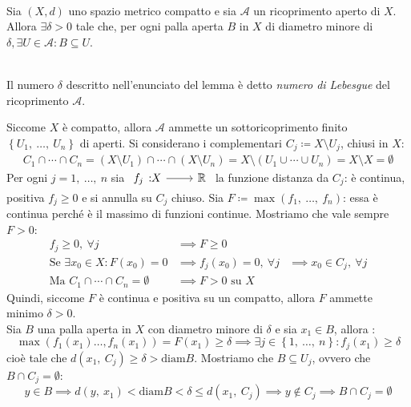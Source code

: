 \begin{lemming}~{}\\\label{teo numero lebesgue}
	Sia $\left(X, d\right)$ uno spazio metrico compatto e sia $\mathcal{A}$ un ricoprimento aperto di $X$. Allora $\exists \delta >0$ tale che, per ogni palla aperta $B$ in $X$ di diametro minore di $\delta, \exists U\in\mathcal{A} \colon B\subseteq U$.	
\end{lemming}
\begin{define}~{}\\
	Il numero $\delta$ descritto nell'enunciato del lemma è detto \textit{numero di Lebesgue}  del ricoprimento $\mathcal{A}$.
\end{define}
\begin{demonstration}
	Siccome $X$ è compatto, allora $\mathcal{A}$ ammette un sottoricoprimento finito $\left\{ U_1,\ \dots,\ U_n \right\}$ di aperti. Si considerano i complementari $C_j\coloneqq X\setminus U_j$, chiusi in $X$:
		\begin{gather*}
			 C_1\cap\cdots\cap C_n=(X\setminus U_1)\cap \cdots\cap(X\setminus U_n)=X\setminus(U_1\cup\cdots\cup U_n)=X\setminus X=\emptyset
		\end{gather*}	
	Per ogni $j=1,\ \dots,\ n$ sia $\funz {f_j} X \realset$ la funzione distanza da $C_j$: è continua, positiva $f_j\geq 0$ e si annulla su $C_j$ chiuso. Sia $F\coloneqq \max(f_1,\ \dots,\ f_n)$: essa è continua perché è il massimo di funzioni continue. Mostriamo che vale sempre $F>0$:
		\begin{equation*}
			\begin{array}{lll}
				f_j\geq 0,\ \forall j & \implies F\geq 0 &\\
				\text{Se } \exists x_0\in X \colon F(x_0)=0 &\implies f_j(x_0)=0,\ \forall j &\implies x_0\in C_j,\ \forall j\\
				\text{Ma } C_1\cap\cdots\cap C_n=\emptyset &\implies F>0 \text{ su } X&
			\end{array}
		\end{equation*}
	Quindi, siccome $F$ è continua e positiva su un compatto, allora $F$ ammette minimo $\delta>0$.\\
	Sia $B$ una palla aperta in $X$ con diametro minore di $\delta$ e sia $x_1\in B$, allora :
		\begin{equation*}
			\max\left( f_1(x_1)\dots,f_n(x_1) \right)=F(x_1)\geq \delta \implies \exists j\in\left\{1,\ \dots,\ n\right\}\colon f_j(x_1)\geq \delta
		\end{equation*}
	cioè tale che $d(x_1,\ C_j)\geq \delta > \text{diam}B$. Mostriamo che $B\subseteq U_j$, ovvero che $B\cap C_j=\emptyset$:
		\begin{equation*}
			y\in B \implies d(y,\ x_1)< \text{diam}B<\delta \leq d(x_1,\ C_j) \implies y\notin C_j \implies B\cap C_j=\emptyset
		\end{equation*}
\end{demonstration}
